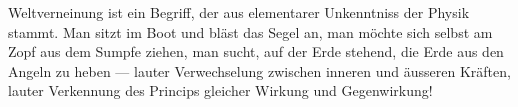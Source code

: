 Weltverneinung ist ein Begriff, der aus elementarer Unkenntniss der Physik stammt. Man sitzt im Boot und bläst das Segel an, man möchte sich selbst am Zopf aus dem Sumpfe ziehen, man sucht, auf der Erde stehend, die Erde aus den Angeln zu heben — lauter Verwechselung zwischen inneren und äusseren Kräften, lauter Verkennung des Princips gleicher Wirkung und Gegenwirkung!
\par

